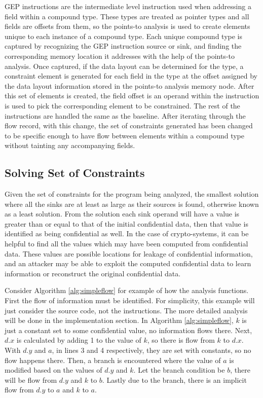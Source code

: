 \documentclass[11pt,a4paper]{article}
\begin{document}
GEP instructions are the intermediate level instruction used when addressing a
field within a compound type. These types are treated as pointer types and all
fields are offsets from them, so the points-to analysis is used to create
elements unique to each instance of a compound type. Each unique compound type
is captured by recognizing the GEP instruction source or sink, and finding the
corresponding memory location it addresses with the help of the points-to
analysis. Once captured, if the data layout can be determined for the type, a
constraint element is generated for each field in the type at the offset
assigned by the data layout information stored in the points-to analysis memory
node. After this set of elements is created, the field offset is an operand
within the instruction is used to pick the corresponding element to be
constrained. The rest of the instructions are handled the same as the baseline.
After iterating through the flow record, with this change, the set of
constraints generated has been changed to be specific enough to have flow
between elements within a compound type without tainting any accompanying
fields.

\subsection{Solving Set of Constraints}
Given the set of constraints for the program being analyzed, the smallest
solution where all the sinks are at least as large as their sources is found,
otherwise known as a least solution. From the solution each sink operand will
have a value is greater than or equal to that of the initial confidential data,
then that value is identified as being confidential as well. In the case of
crypto-systems, it can be helpful to find all the values which may have been
computed from confidential data. These values are possible locations for leakage
of confidential information, and an attacker may be able to exploit the computed
confidential data to learn information or reconstruct the original confidential
data.


Consider Algorithm \ref{alg:simpleflow} for example of how the analysis
functions. First the flow of information must be identified. For simplicity,
this example will just consider the source code, not the instructions. The more
detailed analysis will be done in the implementation section. In Algorithm
\ref{alg:simpleflow}, $k$ is just a constant set to some confidential value, no
information flows there. Next, $d.x$ is calculated by adding 1 to the value of $k$,
so there is flow from $k$ to $d.x$. With $d.y$ and $a$, in lines 3 and 4 respectively,
they are set with constants, so no flow happens there. Then, a branch is
encountered where the value of $a$ is modified based on the values of $d.y$ and
$k$. Let the branch condition be $b$, there will be flow from $d.y$ and $k$ to
$b$. Lastly due to the branch, there is an implicit flow from $d.y$ to $a$ and $k$ to
$a$.
\end{document}

